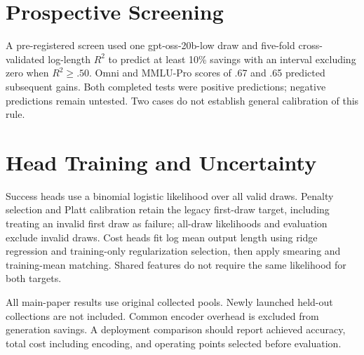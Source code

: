 \documentclass[10pt,twocolumn,letterpaper]{article}
\begin{document}
\section{Prospective Screening}
A pre-registered screen used one gpt-oss-20b-low draw and five-fold cross-validated log-length $R^2$ to predict at least 10\% savings with an interval excluding zero when $R^2\geq .50$. Omni and MMLU-Pro scores of .67 and .65 predicted subsequent gains. Both completed tests were positive predictions; negative predictions remain untested. Two cases do not establish general calibration of this rule.

\section{Head Training and Uncertainty}
Success heads use a binomial logistic likelihood over all valid draws. Penalty selection and Platt calibration retain the legacy first-draw target, including treating an invalid first draw as failure; all-draw likelihoods and evaluation exclude invalid draws. Cost heads fit log mean output length using ridge regression and training-only regularization selection, then apply smearing and training-mean matching. Shared features do not require the same likelihood for both targets.

All main-paper results use original collected pools. Newly launched held-out collections are not included. Common encoder overhead is excluded from generation savings. A deployment comparison should report achieved accuracy, total cost including encoding, and operating points selected before evaluation.
\end{document}
